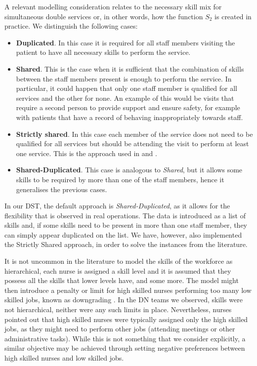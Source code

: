 \documentclass[a4paper,11pt]{elsarticle}
\begin{document}
A relevant modelling consideration relates to the necessary skill mix for simultaneous double services or, in other words, how the function $S_2$ is created in practice. We distinguish the following cases:
\begin{itemize}
    \item \textbf{Duplicated}. In this case it is required for all staff members visiting the patient to have all necessary skills to perform the service.
    \item \textbf{Shared}. This is the case when it is sufficient that the combination of skills between the staff members present is enough to perform the service. In particular, it could happen that only one staff member is qualified for all services and the other for none. An example of this would be visits that require a second person to provide support and ensure safety, for example with patients that have a record of behaving inappropriately towards staff.
    \item \textbf{Strictly shared}. In this case each member of the service does not need to be qualified for all services but should be attending the visit to perform at least one service. This is the approach used in \cite{Mankowska2014} and \cite{AitHaddadene2016}.
    \item \textbf{Shared-Duplicated}. This case is analogous to \emph{Shared}, but it allows some skills to be required by more than one of the staff members, hence it generalises the previous cases.
\end{itemize}

In our DST, the default approach is \emph{Shared-Duplicated}, as it allows for the flexibility that is observed in real operations. The data is introduced as a list of skills and, if some skills need to be present in more than one staff member, they can simply appear duplicated on the list. We have, however, also implemented the Strictly Shared approach, in order to solve the instances from the literature.

It is not uncommon in the literature to model the skills of the workforce as hierarchical, \ie each nurse is assigned a skill level and it is assumed that they possess all the skills that lower levels have, and some more. The model might then introduce a penalty or limit for high skilled nurses performing too many low skilled jobs, known as downgrading \cite[see, \eg][]{Fikar2015}. In the DN teams we observed, skills were not hierarchical, neither were any such limits in place. Nevertheless, nurses pointed out that high skilled nurses were typically assigned only the high skilled jobs, as they might need to perform other jobs (\eg attending meetings or other administrative tasks). While this is not something that we consider explicitly, a similar objective may be achieved through setting negative preferences between high skilled nurses and low skilled jobs.
\end{document}
